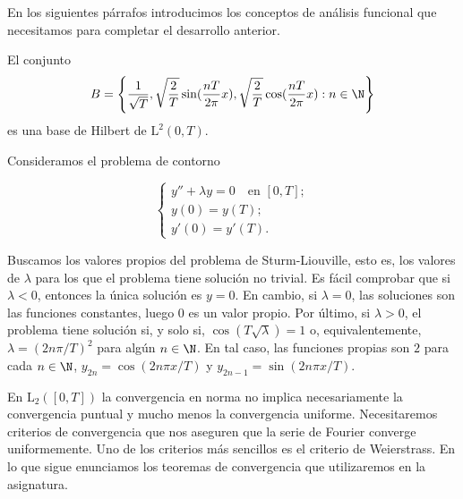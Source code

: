 \documentclass{article}
\begin{document}
En los siguientes párrafos introducimos los conceptos de análisis funcional que necesitamos para
completar el desarrollo
anterior. %

\begin{theorem}
  \label{thm:riesz}
  El conjunto
  \[ B = \left\{\frac{1}{\sqrt{T}}, \sqrt{\frac{2}{T}} \sin(\frac{nT}{2\pi}x), \sqrt{\frac{2}{T}}
      \cos(\frac{nT}{2\pi}x): n \in \N\right\} \] es una base de Hilbert de $\mathrm{L}^2(0,T)$.
\end{theorem}


\begin{ex}
  Consideramos el problema de contorno
  
  \begin{equation}
    \label{eq:3}
    \begin{cases}
      y'' + \lambda y = 0 \quad \text{en }[0,T]; \\
      y(0) = y(T); \\
      y'(0) = y'(T).
    \end{cases}
  \end{equation}

  Buscamos los valores propios del problema de Sturm-Liouville, esto es, los valores de $\lambda$
  para los que el problema tiene solución no trivial. Es fácil comprobar que si $\lambda < 0$,
  entonces la única solución es $y = 0$. En cambio, si $\lambda = 0$, las soluciones son las
  funciones constantes, luego $0$ es un valor propio. Por último, si $\lambda > 0$, el problema
  tiene solución si, y solo si, $\cos(T \sqrt{\lambda}) = 1$ o, equivalentemente,
  $\lambda = (2 n \pi / T)^2$ para algún $n \in \N$. En tal caso, las funciones propias son $2$ para
  cada $n \in \N$, $y_{2n} = \cos(2 n \pi x / T )$ y $y_{2n-1} = \sin(2 n \pi x / T )$.
\end{ex}

En $\mathrm{L}_2([0,T])$ la convergencia en norma no implica necesariamente la convergencia puntual
y mucho menos la convergencia uniforme. Necesitaremos criterios de convergencia que nos aseguren que
la serie de Fourier converge uniformemente. Uno de los criterios más sencillos es el criterio de
Weierstrass. En lo que sigue enunciamos los teoremas de convergencia que utilizaremos en la
asignatura.
\end{document}
